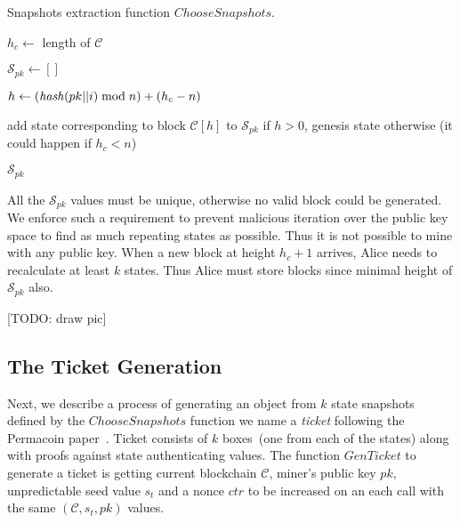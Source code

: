 \documentclass[conference,compsoc]{IEEEtran}
\begin{document}
\begin{algorithm}[H]
\label{alg_snapshots}
\caption{Snapshots extraction function \(ChooseSnapshots\).}
\label{algo_choose_snapshots}
\begin{algorithmic}[1]


\State $h_c \gets $ length of $\mathcal{C}$


\State $\mathcal{S}_{pk} \gets []$


\( h \gets (\mbox{\textit{hash}}(pk || i) \bmod{n}) + (h_c-n) \) 

\State add state corresponding to block $\mathcal{C}[h]$ to $\mathcal{S}_{pk}$ if \(h > 0\), genesis state otherwise (it could happen if \(h_c < n\))

\EndFor

\State \Return $\mathcal{S}_{pk}$

\EndFunction

\end{algorithmic}
\end{algorithm}

All the \(\mathcal{S}_{pk}\) values must be unique, otherwise no valid block could be generated. We enforce such a requirement to prevent malicious iteration over the public key space to find as much repeating states as possible. Thus it is not possible to mine with any public key.  When a new block at height \(h_c + 1\) arrives, Alice needs to recalculate at least \(k\) states. Thus Alice must store blocks since minimal height of \(\mathcal{S}_{pk}\) also.

[TODO: draw pic]


\subsection{The Ticket Generation}

Next, we describe a process of generating an object from \(k\) state snapshots defined by the $ChooseSnapshots$ function we name a \textit{ticket} following the Permacoin paper~\cite{miller2014permacoin}. Ticket consists of \(k\) boxes~(one from each of the states) along with proofs against state authenticating values. The function $GenTicket$ to generate a ticket is getting current blockchain $\mathcal{C}$, miner's public key $pk$, unpredictable seed value $s_t$ and a nonce $ctr$ to be increased on an each call with the same $(\mathcal{C}, s_t, pk)$ values.
\end{document}
